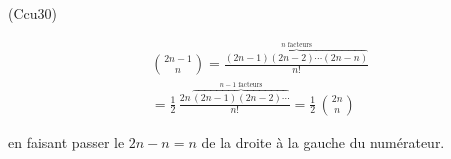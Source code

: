 \begin{tiny}(Ccu30)\end{tiny} 
\begin{multline*}
 \binom{2n-1}{n} = \frac{\overset{n \text{ facteurs}}{\overbrace{(2n-1)(2n-2)\cdots (2n-n)}}}{n!} \\
 = \frac{1}{2}\,\frac{2n\,\overset{n-1 \text{ facteurs}}{\overbrace{(2n-1)(2n-2)\cdots}}}{n!}
 = \frac{1}{2}\,\binom{2n}{n}
\end{multline*}

en faisant passer le $2n -n = n$ de la droite à la gauche du numérateur.
